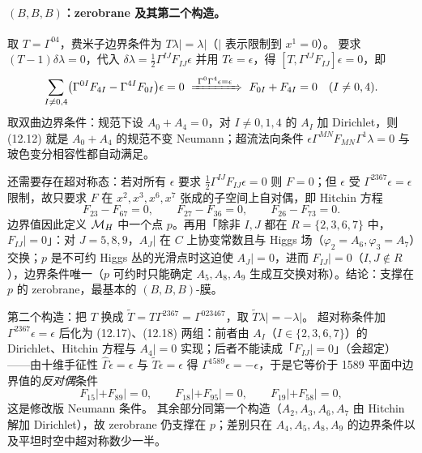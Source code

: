 \paragraph{\((B,B,B)\)：zerobrane 及其第二个构造。}取 \(T=\Gamma^{04}\)，费米子边界条件为 \(T\lambda|=\lambda|\)（\(|\) 表示限制到 \(x^1=0\)）。\pA{} 要求 \((T-1)\delta\lambda=0\)，代入 \(\delta\lambda=\frac12\Gamma^{IJ}F_{IJ}\epsilon\) 并用 \(T\epsilon=\epsilon\)，得 \([T,\Gamma^{IJ}F_{IJ}]\epsilon=0\)，即
\begin{equation}
\sum_{I\neq0,4}\bigl(\Gamma^{0I}F_{4I}-\Gamma^{4I}F_{0I}\bigr)\epsilon=0
\ \xRightarrow{\ \Gamma^0\Gamma^4\epsilon=\epsilon\ }\
F_{0I}+F_{4I}=0\quad(I\neq0,4).
\label{eq:BB-cond}
\end{equation}
\pA{} 取双曲边界条件：规范下设 \(A_0+A_4=0\)，对 \(I\neq0,1,4\) 的 \(A_I\) 加 Dirichlet，则 (12.12) 就是 \(A_0+A_4\) 的规范不变 Neumann；超流法向条件 \(\epsilon\Gamma^{MN}F_{MN}\Gamma^1\lambda=0\) 与玻色变分相容性都自动满足。\pA{}

还需要存在超对称态：若对所有 \(\epsilon\) 要求 \(\frac12\Gamma^{IJ}F_{IJ}\epsilon=0\) 则 \(F=0\)；但 \(\epsilon\) 受 \(\Gamma^{2367}\epsilon=\epsilon\) 限制，故只要求 \(F\) 在 \(x^2,x^3,x^6,x^7\) 张成的子空间上自对偶，即 Hitchin 方程
\begin{equation}
F_{23}-F_{67}=0,\qquad F_{27}-F_{36}=0,\qquad F_{26}-F_{73}=0 .
\label{eq:hitchin-12}
\end{equation}
\pA{} 边界值因此定义 \(\mathcal{M}_H\) 中一个点 \(p\)。再用「除非 \(I,J\) 都在 \(R=\{2,3,6,7\}\) 中，\(F_{IJ}|=0\)」：对 \(J=5,8,9\)，\(A_J|\) 在 \(C\) 上协变常数且与 Higgs 场（\(\varphi_2=A_6,\varphi_3=A_7\)）交换；\(p\) 是不可约 Higgs 丛的光滑点时这迫使 \(A_J|=0\)，进而 \(F_{IJ}|=0\)（\(I,J\notin R\)），边界条件唯一（\(p\) 可约时只能确定 \(A_5,A_8,A_9\) 生成互交换对称）。结论：支撑在 \(p\) 的 zerobrane，最基本的 \((B,B,B)\)-膜。\pA{}

第二个构造：把 \(T\) 换成 \(\tilde T=T\Gamma^{2367}=\Gamma^{023467}\)，取 \(\tilde T\lambda|=-\lambda|\)。\pA{} 超对称条件加 \(\Gamma^{2367}\epsilon=\epsilon\) 后化为 (12.17)、(12.18) 两组：前者由 \(A_I\)（\(I\in\{2,3,6,7\}\)）的 Dirichlet、Hitchin 方程与 \(A_4|=0\) 实现；后者不能读成「\(F_{IJ}|=0\)」（会超定）——由十维手征性 \(\hat\Gamma\epsilon=\epsilon\) 与 \(\tilde T\epsilon=\epsilon\) 得 \(\Gamma^{1589}\epsilon=-\epsilon\)，于是它等价于 1589 平面中边界值的\emph{反对偶}条件
\begin{equation}
F_{15}|+F_{89}|=0,\qquad F_{18}|+F_{95}|=0,\qquad F_{19}|+F_{58}|=0,
\label{eq:BB2-3}
\end{equation}
这是修改版 Neumann 条件。\pA{} 其余部分同第一个构造（\(A_2,A_3,A_6,A_7\) 由 Hitchin 解加 Dirichlet），故 zerobrane 仍支撑在 \(p\)；差别只在 \(A_4,A_5,A_8,A_9\) 的边界条件以及平坦时空中超对称数少一半。\pA{}

